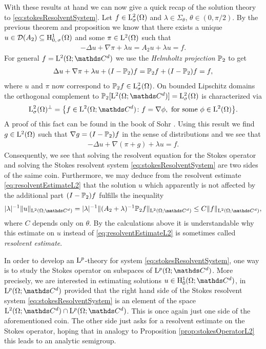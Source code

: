 With these results at hand we can now give a quick recap of the solution theory to \eqref{eq:stokesResolventSystem}.
Let $f \in \mathrm{L}^2_\sigma(\Omega)$ and $\lambda \in \Sigma_\theta$, $\theta \in (0, \pi/2)$.
By the previous theorem and proposition we know that there exists a unique $u \in \mathcal{D}(A_2) \subseteq \mathrm{H}^1_{0,\,\sigma}(\Omega)$ and some $\pi \in \mathrm{L}^2(\Omega)$ such that
\begin{align*}
  -\Delta u + \nabla \pi + \lambda u = A_2 u + \lambda u = f.
\end{align*}
For general $f = \Ell^2(\Omega; \C^d)$ we use the \emph{Helmholtz projection} $\mathbb{P}_2$ to get
\begin{align*}
  \Delta u + \nabla \pi + \lambda u + (I - \mathbb{P}_2) f = \mathbb{P}_2 f + (I - \mathbb{P}_2) f = f,
\end{align*}
where $u$ and $\pi$ now correspond to $\mathbb{P}_2 f \in \mathrm{L}^2_\sigma(\Omega)$. On bounded Lipschitz domains the orthogonal complement to $\PP_2[\Ell^2(\Omega; \C^d)] = \Ell^2_\sigma(\Omega)$ is characterized via
\begin{align*}
  \Ell^2_\sigma(\Omega)^\perp = \big\{ f \in \Ell^2(\Omega; \C^d) \colon f = \nabla \phi, \text{ for some } \phi \in \Ell^2(\Omega) \big\}.
\end{align*}
A proof of this fact can be found in the book of Sohr \cite[Lem.\@~2.5.3]{sohr}.
Using this result we find $g \in \mathrm{L}^2(\Omega)$ such that $\nabla g = (I - \mathbb{P}_2)f$ in the sense of distributions and we see that
\begin{align*}
  -\Delta u + \nabla( \pi + g ) + \lambda u = f.
\end{align*}
Consequently, we see that solving the resolvent equation for the Stokes operator and solving the Stokes resolvent system \eqref{eq:stokesResolventSystem} are two sides of the saime coin.
Furthermore, we may deduce from the resolvent estimate \eqref{eq:resolventEstimateL2} that the solution $u$ which apparently is not affected by the additional part $(I-\mathbb{P}_2)f$ fulfills the inequality
\begin{align*}
  |\lambda|^{-1} \| u\|_{\Ell^2(\Omega; \C^d)} = |\lambda|^{-1} \|(A_2 + \lambda)^{-1} \PP_2 f \|_{\Ell^2(\Omega; \C^d)} \leq C \| f \|_{\Ell^2(\Omega; \C^d)},
\end{align*}
where $C$ depends only on $\theta$.
By the calculations above it is understandable why this estimate on $u$ instead of \eqref{eq:resolventEstimateL2} is sometimes called \emph{resolvent estimate}.

In order to develop an $\mathrm{L}^p$-theory for system \eqref{eq:stokesResolventSystem}, one way is to study the Stokes operator on subspaces of $\Ell^p(\Omega; \C^d)$.
More precisely, we are interested in estimating solutions $u \in \HH^1_0(\Omega; \C^d)$, in $\Ell^p(\Omega; \C^d)$ provided that the right hand side of the Stokes resolvent system \eqref{eq:stokesResolventSystem} is an element of the space $\Ell^2(\Omega; \C^d) \cap \Ell^p(\Omega; \C^d)$.
This is once again just one side of the aforementioned coin. 
The other side just asks for a resolvent estimate on the Stokes operator, hoping that in analogy to Proposition \ref{prop:stokesOperatorL2} this leads to an analytic semigroup.

